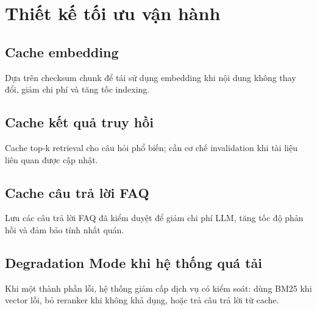 ﻿\section{Thiết kế tối ưu vận hành}

\subsection{Cache embedding}

Dựa trên checksum chunk để tái sử dụng embedding khi nội dung không thay đổi, giảm chi phí và tăng tốc indexing.

\subsection{Cache kết quả truy hồi}

Cache top-k retrieval cho câu hỏi phổ biến; cần cơ chế invalidation khi tài liệu liên quan được cập nhật.

\subsection{Cache câu trả lời FAQ}

Lưu các câu trả lời FAQ đã kiểm duyệt để giảm chi phí LLM, tăng tốc độ phản hồi và đảm bảo tính nhất quán.

\subsection{Degradation Mode khi hệ thống quá tải}

Khi một thành phần lỗi, hệ thống giảm cấp dịch vụ có kiểm soát: dùng BM25 khi vector lỗi, bỏ reranker khi không khả dụng, hoặc trả câu trả lời từ cache.
